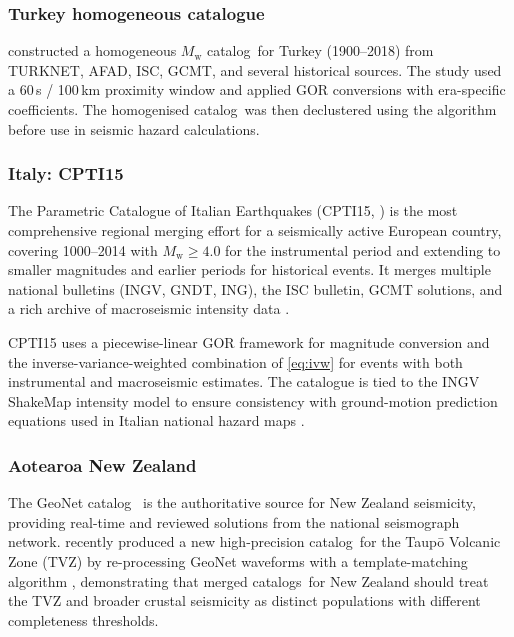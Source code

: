 \documentclass[12pt]{article}
\newcommand{\catalog}{catalog}
\newcommand{\catalogs}{catalogs}
\begin{document}
\subsubsection{Turkey homogeneous catalogue}

\citet{Tan2021} constructed a homogeneous $M_\mathrm{w}$ \catalog\ for Turkey
(1900--2018) from TURKNET, AFAD, ISC, GCMT, and several historical sources.
The study used a 60\,s / 100\,km proximity window and applied GOR conversions
with era-specific coefficients.  The homogenised
\catalog\ was then declustered using the \citet{Reasenberg1985} algorithm
before use in seismic hazard calculations.

\subsubsection{Italy: CPTI15}

The Parametric Catalogue of Italian Earthquakes (CPTI15, \citealt{CPTI15})
is the most comprehensive regional merging effort for a seismically active
European country, covering 1000--2014 with $M_\mathrm{w} \geq 4.0$ for the
instrumental period and extending to smaller magnitudes and earlier periods
for historical events.  It merges multiple national bulletins
(INGV, GNDT, ING), the ISC bulletin, GCMT solutions, and a rich archive of
macroseismic intensity data \citep{DBMI15}.

CPTI15 uses a piecewise-linear GOR framework \citep{Gasperini2012} for
magnitude conversion and the inverse-variance-weighted combination of
\eqref{eq:ivw} for events with both instrumental and macroseismic estimates.
The catalogue is tied to the INGV ShakeMap intensity model to ensure
consistency with ground-motion prediction equations used in Italian national
hazard maps \citep{Stucchi2013}.

\subsubsection{Aotearoa New Zealand}

The GeoNet \catalog\ \citep{GeoNetEqCatalogue} is the authoritative source for
New Zealand seismicity, providing real-time and reviewed solutions from the
national seismograph network.  \citet{Illsley2025} recently produced a new
high-precision \catalog\ for the Taupō Volcanic Zone (TVZ) by re-processing
GeoNet waveforms with a template-matching algorithm \citep{Chamberlain2018},
demonstrating that merged \catalogs\ for New Zealand should treat the TVZ and
broader crustal seismicity as distinct populations with different completeness
thresholds.
\end{document}
